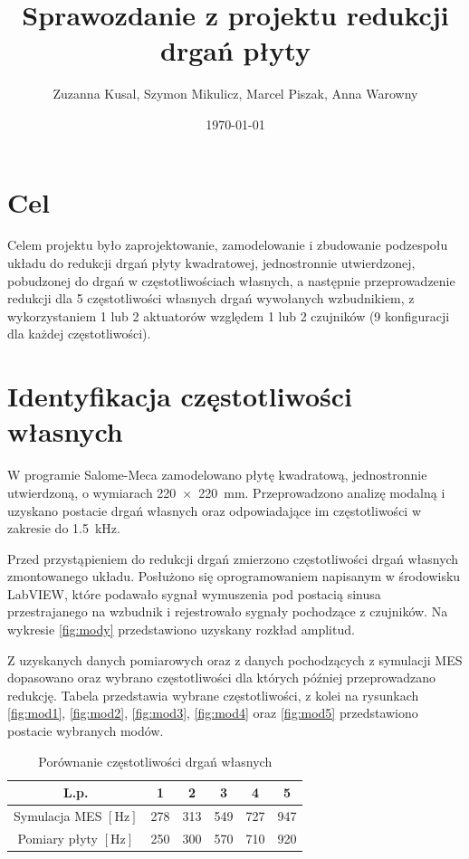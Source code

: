 \documentclass[polish,a4paper,11pt]{mwart}
\date{\today}
\author{Zuzanna Kusal, Szymon Mikulicz, Marcel Piszak, Anna Warowny}
\title{Sprawozdanie z projektu redukcji drgań płyty}
\let\Oldsection\section
\renewcommand{\section}{\FloatBarrier\Oldsection}
\begin{document}
\maketitle

\section{Cel}

Celem projektu było zaprojektowanie, zamodelowanie i zbudowanie podzespołu
układu do redukcji drgań płyty kwadratowej, jednostronnie utwierdzonej,
pobudzonej do drgań w częstotliwościach własnych, a następnie przeprowadzenie
redukcji dla 5 częstotliwości własnych drgań wywołanych wzbudnikiem, z
wykorzystaniem 1 lub 2 aktuatorów względem 1 lub 2 czujników (9 konfiguracji
dla każdej częstotliwości).

\section{Identyfikacja częstotliwości własnych} \label{ident}

W programie Salome-Meca zamodelowano płytę kwadratową, jednostronnie
utwierdzoną, o wymiarach \SI{220 x 220}{\milli\meter}. Przeprowadzono analizę
modalną i uzyskano postacie drgań własnych  oraz odpowiadające im
częstotliwości w zakresie do \SI{1.5}{\kilo\hertz}.

Przed przystąpieniem do redukcji drgań zmierzono częstotliwości drgań własnych
zmontowanego układu. Posłużono się oprogramowaniem napisanym w środowisku
LabVIEW\texttrademark, które podawało sygnał wymuszenia pod postacią sinusa
przestrajanego na wzbudnik i rejestrowało sygnały pochodzące z czujników. Na
wykresie \ref{fig:mody} przedstawiono uzyskany rozkład amplitud.

Z uzyskanych danych pomiarowych oraz z danych pochodzących z symulacji MES
dopasowano oraz wybrano częstotliwości dla których później przeprowadzano
redukcję. Tabela  przedstawia wybrane częstotliwości, z kolei na rysunkach
\ref{fig:mod1}, \ref{fig:mod2}, \ref{fig:mod3}, \ref{fig:mod4} oraz
\ref{fig:mod5} przedstawiono postacie wybranych modów.

\begin{table}[!tbh]
  \centering
  \caption{Porównanie częstotliwości drgań własnych}
  \begin{tabular}{|c|c|c|c|c|c|} \hline
    L.p. & 1 & 2 & 3 & 4 & 5 \\ \hline
    Symulacja MES $[\si{\hertz}]$ & 278 & 313 & 549 & 727 & 947 \\ \hline
    Pomiary płyty $[\si{\hertz}]$ & 250 & 300 & 570 & 710 & 920 \\ \hline
  \end{tabular}
  \label{tab:identyfikacja}
\end{table}
\end{document}
